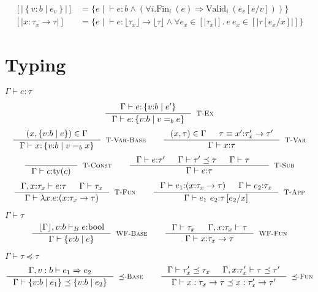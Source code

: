 \documentclass[10pt,a4paper]{article}
\newcommand\rulename[1]{\textsc{#1}\xspace}
\newcommand\rwbase{\rulename{WF-Base}}
\newcommand\rwfun{\rulename{WF-Fun}}
\newcommand\rsubbase{\ensuremath{\preceq}\rulename{-Base}}
\newcommand\rsubfun{\ensuremath{\preceq}\rulename{-Fun}}
\newcommand\rtvar{\rulename{T-Var}}
\newcommand\rtvarbase{\rulename{T-Var-Base}}
\newcommand\rtconst{\rulename{T-Const}}
\newcommand\rtsub{\rulename{T-Sub}}
\newcommand\rtexact{\rulename{T-Ex}}
\newcommand\rtfun{\rulename{T-Fun}}
\newcommand\rtapp{\rulename{T-App}}
\newcommand\efun[2]{\ensuremath{\lambda #1 . #2}}
\newcommand\eapp[2]{\ensuremath{#1 \ #2}}
\newcommand\tbool{\ensuremath{\text{bool}}}
\newcommand\tref[3]{\ensuremath{\left\lbrace #1 \colon #2 \mid #3 \right\rbrace}}
\newcommand\tfun[3]{\ensuremath{#1\colon #2 \rightarrow #3}}
\newcommand\eqb[1]{\ensuremath{=_{#1}}}
\newcommand\validi[1]{\ensuremath{\text{Valid}_{i}\ (#1)}}
\newcommand\fini[1]{\ensuremath{\text{Fin}_{i}\ (#1)}}
\newcommand\generalconditionInterp[2]
	{\ensuremath{(\forall i. \fini{#1} \Rightarrow \validi{#2})}}
\newcommand\ty[1]{\ensuremath{\text{ty}({#1})}}
\newcommand\sub[2]{\ensuremath{\left[ #2 / #1 \right]}}
\newcommand\erase[1]{\ensuremath{\lfloor #1 \rfloor}}
\newcommand\interp[1]{\ensuremath{[|#1|]}}
\newcommand\hastype[3]{\ensuremath{#1 \vdash #2 \colon #3}}
\newcommand\hastypebase[3]{\ensuremath{#1 \vdash_B #2 \colon #3}}
\newcommand\iswellformed[2]{\ensuremath{#1 \vdash #2}}
\newcommand\issubtype[3]{\ensuremath{#1 \vdash #2 \preceq #3}}
\newcommand\issubref[3]{\ensuremath{#1 \vdash #2 \Rightarrow #3}}
\begin{document}
\begin{align*}
\interp{\tref{v}{b}{e_v}} &= 
	\{e \mid \hastype{}{e}{b} 
	\land 
	\generalconditionInterp{e}{e_v\sub{v}{e}} 
	\}\\
\interp{\tfun{x}{\tau_x}{\tau}} &= 
	\{e \mid \hastype{}{e}{\erase{\tau_x} \rightarrow \erase{\tau}} 
	\land 
	\forall e_x \in \interp{\tau_x}. \
	 \eapp{e}{e_x} \in \interp{\tau\sub{x}{e_x}} 
	 \}
\end{align*}

\section*{Typing}

\hfill\mbox{\hastype{\Gamma}{e}{\tau}}

$$
\inference{
	\hastype{\Gamma}{e}{\tref{v}{b}{e'}}
}{
	\hastype{\Gamma}{e}{\tref{v}{b}{v \eqb{b} e}}
}[\rtexact]
$$
$$
\inference{
	(x,\tref{v}{b}{e}) \in \Gamma
}{
	\hastype{\Gamma}{x}{\tref{v}{b}{v \eqb{b} x}}
}[\rtvarbase]
\qquad
\inference{
	(x,\tau) \in \Gamma &&
	\tau \equiv \tfun{x'}{\tau_x'}{\tau'}
}{
	\hastype{\Gamma}{x}{\tau}
}[\rtvar]
$$
$$
\inference{
}{
	\hastype{\Gamma}{c}{\ty{c}}
}[\rtconst]
\qquad
\inference{
	\hastype{\Gamma}{e}{\tau'} &&
	\issubtype{\Gamma}{\tau'}{\tau} &&
	\iswellformed{\Gamma}{\tau} &&
}{
	\hastype{\Gamma}{e}{\tau}
}[\rtsub]
$$
$$
\inference{
	\hastype{\Gamma, x\colon\tau_x}{e}{\tau} &&
	\iswellformed{\Gamma}{\tau_x}
}{
	\hastype{\Gamma}{\efun{x}{e}}{(\tfun{x}{\tau_x}{\tau})}
}[\rtfun]
\qquad
\inference{
	\hastype{\Gamma}{e_1}{(\tfun{x}{\tau_{x}}{\tau})} &&
	\hastype{\Gamma}{e_2}{\tau_{x}}
}{
	\hastype{\Gamma}{\eapp{e_1}{e_2}}{\tau\sub{x}{e_2}}
}[\rtapp]
$$


\hfill\mbox{\iswellformed{\Gamma}{\tau}}
$$
\inference{
	\hastypebase{\erase{\Gamma}, v\colon b}{e}{\tbool}
}{
	\iswellformed{\Gamma}{\tref{v}{b}{e}}
}[\rwbase]
\qquad
\inference{
	\iswellformed{\Gamma}{\tau_x} &&
	\iswellformed{\Gamma, x \colon \tau_x}{\tau}
}{
	\iswellformed{\Gamma}{\tfun{x}{\tau_x}{\tau}}
}[\rwfun]
$$

\hfill\mbox{\issubtype{\Gamma}{\tau}{\tau}}
$$
\inference{
	\issubref{\Gamma, v:b}{e_1}{e_2}
}{
	\issubtype{\Gamma}{\tref{v}{b}{e_1}}{\tref{v}{b}{e_2}}
}[\rsubbase]
\qquad
\inference{
	\issubtype{\Gamma}{\tau'_x}{\tau_x} &&
	\issubtype{\Gamma, x \colon \tau'_x}{\tau}{\tau'}
}{
	\issubtype{\Gamma}{x:\tau_x \rightarrow \tau}{x:\tau'_x \rightarrow \tau'}
}[\rsubfun]
$$
\end{document}
